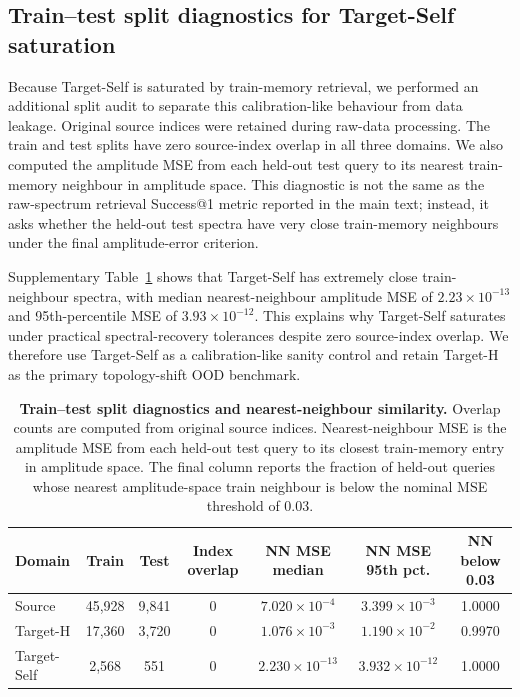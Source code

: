 \documentclass[final,1p,times]{elsarticle}
\begin{document}
\subsection{Train--test split diagnostics for Target-Self saturation}

Because Target-Self is saturated by train-memory retrieval, we performed an additional split audit to separate this calibration-like behaviour from data leakage. Original source indices were retained during raw-data processing. The train and test splits have zero source-index overlap in all three domains. We also computed the amplitude MSE from each held-out test query to its nearest train-memory neighbour in amplitude space. This diagnostic is not the same as the raw-spectrum retrieval Success@1 metric reported in the main text; instead, it asks whether the held-out test spectra have very close train-memory neighbours under the final amplitude-error criterion.

Supplementary Table~\ref{tab:si_split_similarity} shows that Target-Self has extremely close train-neighbour spectra, with median nearest-neighbour amplitude MSE of $2.23\times10^{-13}$ and 95th-percentile MSE of $3.93\times10^{-12}$. This explains why Target-Self saturates under practical spectral-recovery tolerances despite zero source-index overlap. We therefore use Target-Self as a calibration-like sanity control and retain Target-H as the primary topology-shift OOD benchmark.

\begin{table}[htbp!]
\centering
\caption{\textbf{Train--test split diagnostics and nearest-neighbour similarity.}
Overlap counts are computed from original source indices. Nearest-neighbour MSE is the amplitude MSE from each held-out test query to its closest train-memory entry in amplitude space. The final column reports the fraction of held-out queries whose nearest amplitude-space train neighbour is below the nominal MSE threshold of 0.03.}
\label{tab:si_split_similarity}
\footnotesize
\setlength{\tabcolsep}{4.0pt}
\renewcommand{\arraystretch}{1.12}
\begin{tabular}{lcccccc}
\toprule
Domain & Train & Test & Index overlap & NN MSE median & NN MSE 95th pct. & NN below 0.03 \\
\midrule
Source & 45,928 & 9,841 & 0 & $7.020\times10^{-4}$ & $3.399\times10^{-3}$ & 1.0000 \\
Target-H & 17,360 & 3,720 & 0 & $1.076\times10^{-3}$ & $1.190\times10^{-2}$ & 0.9970 \\
Target-Self & 2,568 & 551 & 0 & $2.230\times10^{-13}$ & $3.932\times10^{-12}$ & 1.0000 \\
\bottomrule
\end{tabular}
\end{table}
\end{document}
